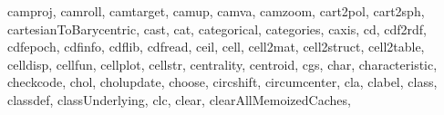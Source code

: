 {{        camproj,%
        camroll,%
        camtarget,%
        camup,%
        camva,%
        camzoom,%
        cart2pol,%
        cart2sph,%
        cartesianToBarycentric,%
        cast,%
        cat,%
        categorical,%
        categories,%
        caxis,%
        cd,%
        cdf2rdf,%
        cdfepoch,%
        cdfinfo,%
        cdflib,%
        cdfread,%
        ceil,%
        cell,%
        cell2mat,%
        cell2struct,%
        cell2table,%
        celldisp,%
        cellfun,%
        cellplot,%
        cellstr,%
        centrality,%
        centroid,%
        cgs,%
        char,%
        characteristic,%
        checkcode,%
        chol,%
        cholupdate,%
        choose,%
        circshift,%
        circumcenter,%
        cla,%
        clabel,%
        class,%
        classdef,%
        classUnderlying,%
        clc,%
        clear,%
        clearAllMemoizedCaches,%
}}
